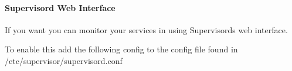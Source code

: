 \paragraph*{Supervisord Web Interface}

If you want you can monitor your services in using Supervisord\textquotesingle{}s web interface.

To enable this add the following config to the config file found in {\ttfamily /etc/supervisor/supervisord.conf}


\begin{DoxyCode}{0}
\end{DoxyCode}
 